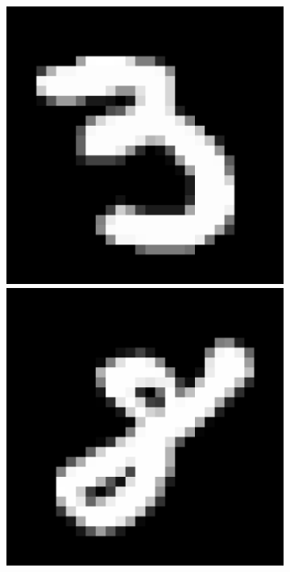 \begin{figure}[H]
\begin{subfigure}[b]{2cm}
    \vspace{0.15cm}
    \end{subfigure}%
    \hspace{0.0075\textwidth}
    \begin{subfigure}[b]{2cm}
    \includegraphics[width =\textwidth]{figs/MNIST/mnist_3.pdf}
    \vspace{-1.07\baselineskip}\\[1ex]
    \includegraphics[width =\textwidth]{figs/MNIST/mnist_8.pdf}

\end{subfigure}
\end{figure}
